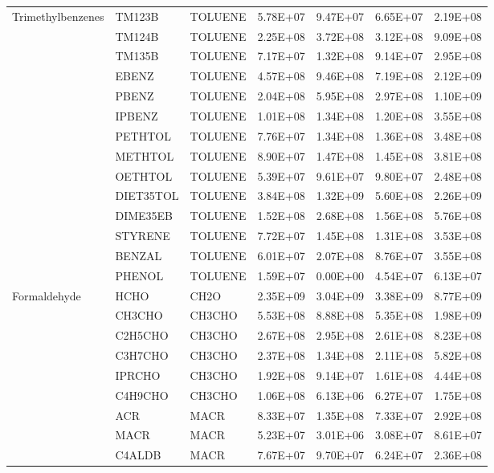 \begin{longtable}{lllllll}
	\hline \multirow{3}{*}{Trimethylbenzenes} & TM123B & TOLUENE & 5.78E+07 & 9.47E+07 & 6.65E+07 & 2.19E+08 \\
	 & TM124B & TOLUENE & 2.25E+08 & 3.72E+08 & 3.12E+08 & 9.09E+08 \\
	 & TM135B & TOLUENE & 7.17E+07 & 1.32E+08 & 9.14E+07 & 2.95E+08 \\
	\hline \parbox[t]{2mm}{} & EBENZ & TOLUENE & 4.57E+08 & 9.46E+08 & 7.19E+08 & 2.12E+09 \\
	 & PBENZ & TOLUENE & 2.04E+08 & 5.95E+08 & 2.97E+08 & 1.10E+09 \\
	 & IPBENZ & TOLUENE & 1.01E+08 & 1.34E+08 & 1.20E+08 & 3.55E+08 \\
	 & PETHTOL & TOLUENE & 7.76E+07 & 1.34E+08 & 1.36E+08 & 3.48E+08 \\
	 & METHTOL & TOLUENE & 8.90E+07 & 1.47E+08 & 1.45E+08 & 3.81E+08 \\
	 & OETHTOL & TOLUENE & 5.39E+07 & 9.61E+07 & 9.80E+07 & 2.48E+08 \\
	 & DIET35TOL & TOLUENE & 3.84E+08 & 1.32E+09 & 5.60E+08 & 2.26E+09 \\
	 & DIME35EB & TOLUENE & 1.52E+08 & 2.68E+08 & 1.56E+08 & 5.76E+08 \\
	 & STYRENE & TOLUENE & 7.72E+07 & 1.45E+08 & 1.31E+08 & 3.53E+08 \\
	 & BENZAL & TOLUENE & 6.01E+07 & 2.07E+08 & 8.76E+07 & 3.55E+08 \\
	 & PHENOL & TOLUENE & 1.59E+07 & 0.00E+00 & 4.54E+07 & 6.13E+07 \\
	\hline Formaldehyde & HCHO & CH2O & 2.35E+09 & 3.04E+09 & 3.38E+09 & 8.77E+09 \\ \hline
	\parbox[t]{2mm}{} & CH3CHO & CH3CHO & 5.53E+08 & 8.88E+08 & 5.35E+08 & 1.98E+09 \\
	 & C2H5CHO & CH3CHO & 2.67E+08 & 2.95E+08 & 2.61E+08 & 8.23E+08 \\
	 & C3H7CHO & CH3CHO & 2.37E+08 & 1.34E+08 & 2.11E+08 & 5.82E+08 \\
	 & IPRCHO & CH3CHO & 1.92E+08 & 9.14E+07 & 1.61E+08 & 4.44E+08 \\
	 & C4H9CHO & CH3CHO & 1.06E+08 & 6.13E+06 & 6.27E+07 & 1.75E+08 \\
	 & ACR & MACR & 8.33E+07 & 1.35E+08 & 7.33E+07 & 2.92E+08 \\
	 & MACR & MACR & 5.23E+07 & 3.01E+06 & 3.08E+07 & 8.61E+07 \\
	 & C4ALDB & MACR & 7.67E+07 & 9.70E+07 & 6.24E+07 & 2.36E+08 \\

\end{longtable}
